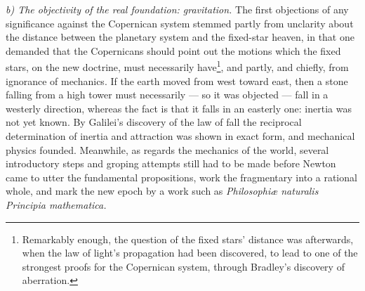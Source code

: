 \documentclass[12pt,a4paper]{book}
\newcommand{\runin}[1]{\emph{#1}\hspace{0.4em}}
\begin{document}
\runin{b) The objectivity of the real foundation: gravitation.} The first objections of any significance
against the Copernican system stemmed partly from unclarity about the distance between the planetary system
and the fixed-star heaven, in that one demanded that the Copernicans should point out the motions which the
fixed stars, on the new doctrine, must necessarily have\footnote{%
Remarkably enough, the question of the fixed stars' distance was afterwards, when the law of light's
propagation had been discovered, to lead to one of the strongest proofs for the Copernican system, through
Bradley's discovery of aberration.}, and partly, and chiefly, from ignorance of mechanics. If the earth moved
from west toward east, then a stone falling from a high tower must necessarily --- so it was objected --- fall
in a westerly direction, whereas the fact is that it falls in an easterly one: inertia was not yet known. By
Galilei's discovery of the law of fall the reciprocal determination of inertia and attraction was shown in
exact form, and mechanical physics founded. Meanwhile, as regards the mechanics of the world, several
introductory steps and groping attempts still had to be made before Newton came to utter the fundamental
propositions, work the fragmentary into a rational whole, and mark the new
epoch by a work such as \textit{Philosophiæ naturalis Principia mathematica.}
\end{document}
